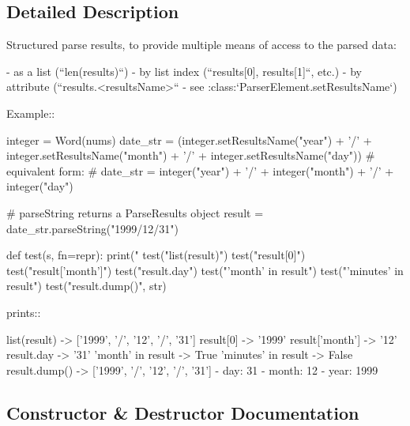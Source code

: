 \subsection{Detailed Description}
\begin{DoxyVerb}Structured parse results, to provide multiple means of access to
the parsed data:

   - as a list (``len(results)``)
   - by list index (``results[0], results[1]``, etc.)
   - by attribute (``results.<resultsName>`` - see :class:`ParserElement.setResultsName`)

Example::

    integer = Word(nums)
    date_str = (integer.setResultsName("year") + '/'
                    + integer.setResultsName("month") + '/'
                    + integer.setResultsName("day"))
    # equivalent form:
    # date_str = integer("year") + '/' + integer("month") + '/' + integer("day")

    # parseString returns a ParseResults object
    result = date_str.parseString("1999/12/31")

    def test(s, fn=repr):
        print("%
    test("list(result)")
    test("result[0]")
    test("result['month']")
    test("result.day")
    test("'month' in result")
    test("'minutes' in result")
    test("result.dump()", str)

prints::

    list(result) -> ['1999', '/', '12', '/', '31']
    result[0] -> '1999'
    result['month'] -> '12'
    result.day -> '31'
    'month' in result -> True
    'minutes' in result -> False
    result.dump() -> ['1999', '/', '12', '/', '31']
    - day: 31
    - month: 12
    - year: 1999
\end{DoxyVerb}
 

\subsection{Constructor \& Destructor Documentation}
\mbox{\label{classpyparsing_1_1ParseResults_aab2739eb471f9a028b6600b3459ce87e}} 
